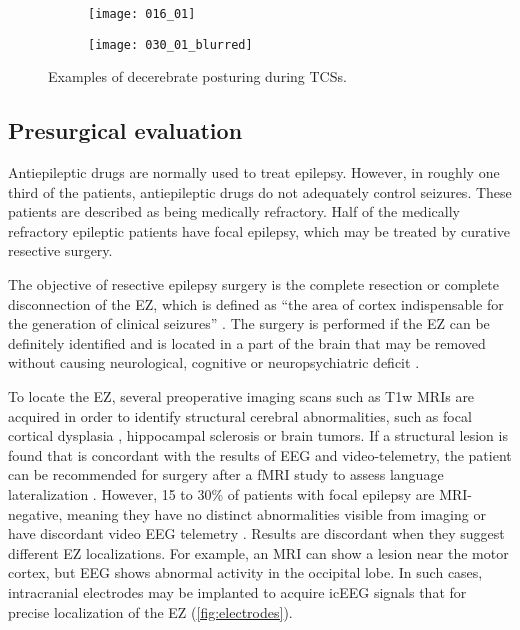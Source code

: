 \begin{figure}
  \centering

  \begin{subfigure}{0.49\linewidth}
    \texttt{[image: 016\_01]}
  \end{subfigure}
  \begin{subfigure}{0.49\linewidth}
    \texttt{[image: 030\_01\_blurred]}
  \end{subfigure}
  \caption[Examples of decerebrate posturing]{
    Examples of decerebrate posturing during \acp{TCS}.
  }
  \label{fig:decerebration}
\end{figure}


\subsection{Presurgical evaluation}

Antiepileptic drugs are normally used to treat epilepsy.
However, in roughly one third of the patients, antiepileptic drugs do not adequately control seizures.
These patients are described as being medically refractory.
Half of the medically refractory epileptic patients have focal epilepsy, which may be treated by curative resective surgery.

The objective of resective epilepsy surgery is the complete resection or complete disconnection of the \ac{EZ}, which is defined as ``the area of cortex indispensable for the generation of clinical seizures'' \cite{rosenow_presurgical_2001}.
The surgery is performed if the \ac{EZ} can be definitely identified and is located in a part of the brain that may be removed without causing neurological, cognitive or neuropsychiatric deficit \cite{jobst_resective_2015}.

To locate the \ac{EZ}, several preoperative imaging scans such as \ac{T1w} \acp{MRI} are acquired in order to identify structural cerebral abnormalities, such as focal cortical dysplasia \cite{kabat_focal_2012}, hippocampal sclerosis \cite{thom_review_2014} or brain tumors.
If a structural lesion is found that is concordant with the results of \ac{EEG} and video-telemetry, the patient can be recommended for surgery after a \ac{fMRI} study to assess language lateralization \cite{duncan_brain_2016}.
However, 15 to 30\% of patients with focal epilepsy are \ac{MRI}-negative, meaning they have no distinct abnormalities visible from imaging or have discordant video \ac{EEG} telemetry \cite{bien_characteristics_2009}.
Results are discordant when they suggest different \ac{EZ} localizations.
For example, an \ac{MRI} can show a lesion near the motor cortex, but \ac{EEG} shows abnormal activity in the occipital lobe.
In such cases, intracranial electrodes may be implanted to acquire \ac{icEEG} signals that for precise localization of the \ac{EZ} (\cref{fig:electrodes}).

